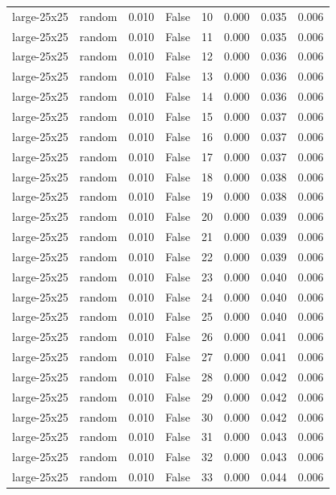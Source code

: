 \begin{tabular}{llrrrrrr}
large-25x25 & random & 0.010 & False & 10 & 0.000 & 0.035 & 0.006 \\
large-25x25 & random & 0.010 & False & 11 & 0.000 & 0.035 & 0.006 \\
large-25x25 & random & 0.010 & False & 12 & 0.000 & 0.036 & 0.006 \\
large-25x25 & random & 0.010 & False & 13 & 0.000 & 0.036 & 0.006 \\
large-25x25 & random & 0.010 & False & 14 & 0.000 & 0.036 & 0.006 \\
large-25x25 & random & 0.010 & False & 15 & 0.000 & 0.037 & 0.006 \\
large-25x25 & random & 0.010 & False & 16 & 0.000 & 0.037 & 0.006 \\
large-25x25 & random & 0.010 & False & 17 & 0.000 & 0.037 & 0.006 \\
large-25x25 & random & 0.010 & False & 18 & 0.000 & 0.038 & 0.006 \\
large-25x25 & random & 0.010 & False & 19 & 0.000 & 0.038 & 0.006 \\
large-25x25 & random & 0.010 & False & 20 & 0.000 & 0.039 & 0.006 \\
large-25x25 & random & 0.010 & False & 21 & 0.000 & 0.039 & 0.006 \\
large-25x25 & random & 0.010 & False & 22 & 0.000 & 0.039 & 0.006 \\
large-25x25 & random & 0.010 & False & 23 & 0.000 & 0.040 & 0.006 \\
large-25x25 & random & 0.010 & False & 24 & 0.000 & 0.040 & 0.006 \\
large-25x25 & random & 0.010 & False & 25 & 0.000 & 0.040 & 0.006 \\
large-25x25 & random & 0.010 & False & 26 & 0.000 & 0.041 & 0.006 \\
large-25x25 & random & 0.010 & False & 27 & 0.000 & 0.041 & 0.006 \\
large-25x25 & random & 0.010 & False & 28 & 0.000 & 0.042 & 0.006 \\
large-25x25 & random & 0.010 & False & 29 & 0.000 & 0.042 & 0.006 \\
large-25x25 & random & 0.010 & False & 30 & 0.000 & 0.042 & 0.006 \\
large-25x25 & random & 0.010 & False & 31 & 0.000 & 0.043 & 0.006 \\
large-25x25 & random & 0.010 & False & 32 & 0.000 & 0.043 & 0.006 \\
large-25x25 & random & 0.010 & False & 33 & 0.000 & 0.044 & 0.006 \\

\end{tabular}
